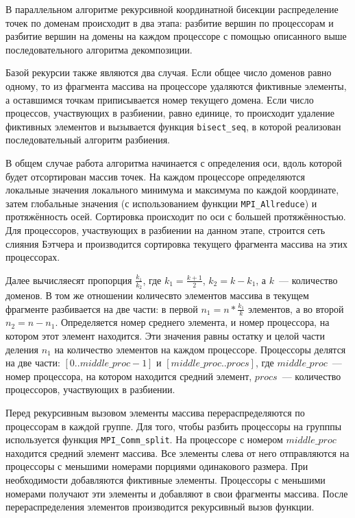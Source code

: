 \documentclass[oneside,final,14pt]{extreport}
\begin{document}
В параллельном алгоритме рекурсивной координатной бисекции распределение точек
по доменам происходит в два этапа: разбитие вершин по процессорам и
разбитие вершин на домены на каждом процессоре с помощью описанного
выше последовательного алгоритма декомпозиции.

Базой рекурсии также являются два случая. Если общее число доменов равно
одному, то из фрагмента массива на процессоре удаляются фиктивные элементы,
а оставшимся точкам приписывается номер текущего домена. Если число
процессов, участвующих в разбиении, равно единице, то происходит удаление
фиктивных элементов и вызывается функция \texttt{bisect\_seq},
в которой реализован последовательный алгоритм разбиения.

В общем случае работа алгоритма начинается с определения оси, вдоль которой
будет отсортирован массив точек. На каждом процессоре определяются локальные
значения локального минимума и максимума по каждой координате, затем
глобальные значения (с использованием функции \texttt{MPI\_Allreduce}) и
протяжённость осей. Сортировка происходит по оси с большей протяжённостью.
Для процессоров, участвующих в разбиении на данном этапе, строится сеть слияния
Бэтчера и производится сортировка текущего фрагмента массива на этих
процессорах.

Далее вычисляесят пропорция $\frac{k_1}{k_2}$, где $k_1 = \frac{k + 1}{2}$,
$k_2 = k - k_1$, а $k$~--- количество доменов. В том же отношении
количесвто элементов массива в текущем фрагменте разбивается на две части:
в первой $n_1 = n * \frac{k_1}{k}$ элементов, а во второй $n_2 = n - n_1$.
Определяется номер среднего элемента, и номер процессора, на котором
этот элемент находится. Эти значения равны остатку и целой части деления
$n_1$ на количество элементов на каждом процессоре. Процессоры делятся на две
части: $[0 .. middle\_proc - 1]$ и $[middle\_proc .. procs]$, где
$middle\_proc$~--- номер процессора, на котором находится средний элемент,
$procs$~--- количество процессоров, участвующих в разбиении.

Перед рекурсивным вызовом элементы массива перераспределяются по процессорам
в каждой группе. Для того, чтобы разбить процессоры на групппы используется
функция \texttt{MPI\_Comm\_split}. На процессоре с номером $middle\_proc$
находится средний элемент массива. Все элементы слева от него отправляются
на процессоры с меньшими номерами порциями одинакового размера. При
необходимости добавляются фиктивные элементы. Процессоры с меньшими номерами
получают эти элементы и добавляют в свои фрагменты массива. После
перераспределения элементов производится рекурсивный вызов функции.
\end{document}
